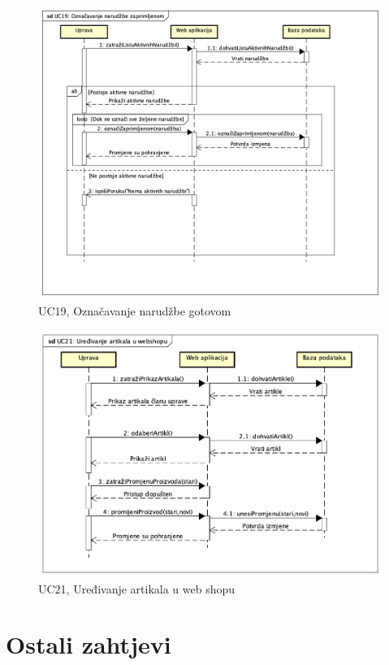 				\begin{figure}[H]
					\includegraphics[scale=0.4]{dijagrami/UC19.png}
					\centering
					\caption{UC19, Označavanje narudžbe gotovom}
					\label{fig:SequanceDiagram3}
				\end{figure}
			
				\begin{figure}[H]
					\includegraphics[scale=0.4]{dijagrami/UC21.png}
					\centering
					\caption{UC21, Uređivanje artikala u web shopu}
					\label{fig:SequanceDiagram4}
				\end{figure}
	
		\section{Ostali zahtjevi}
		

